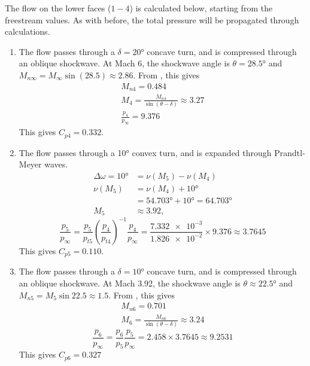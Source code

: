 \documentclass[a4paper]{article}
\begin{document}
The flow on the lower faces (\(1-4\)) is calculated below, starting from the freestream values. As with before, the total pressure will be propagated through calculations.
\begin{enumerate}[label=\arabic*), start=4]
	\item The flow passes through a \(\delta = \ang{20}\) concave turn, and is compressed through an oblique shockwave.
	At Mach 6, the shockwave angle is \(\theta = \ang{28.5}\) and\(M_{n\infty} = M_{\infty}\sin(28.5) \approx 2.86\). From \cite{NASATables}, this gives
	\begin{gather*}
		M_{n4} = 0.484 \\
		M_4 = \frac{M_{n4}}{\sin(\theta - \delta)} \approx 3.27 \\
		\frac{p_4}{p_\infty} = 9.376
	\end{gather*}
	This gives \(C_{p4} = 0.332\).

	\item The flow passes through a \ang{10} convex turn, and is expanded through Prandtl-Meyer waves.
	\begin{align*}
		\Delta \omega = \ang{10} &= \nu(M_5) - \nu(M_4) \\
		\nu(M_5) &= \nu(M_4) + \ang{10} \\
		&= \ang{54.703} + \ang{10} = \ang{64.703} \\
		M_5 &\approx 3.92,\
	\end{align*}
	\begin{equation*}
		\frac{p_5}{p_\infty} = \frac{p_5}{p_{t5}} \left( \frac{p_4}{p_{t4}} \right)^{-1} \frac{p_4}{p_\infty}
		= \frac{\num{7.332e-3}}{\num{1.826e-2}} \times 9.376
		\approx 3.7645
	\end{equation*}
	This gives \(C_{p5} = 0.110\).

	\item The flow passes through a \(\delta = \ang{10}\) concave turn, and is compressed through an oblique shockwave. At Mach 3.92, the shockwave angle is \(\theta \approx \ang{22.5}\) and \(M_{n5} = M_5 \sin{22.5} \approx 1.5\). From \cite{NASATables}, this gives
	\begin{gather*}
		M_{n6} = 0.701 \\
		M_6 = \frac{M_{n6}}{\sin(\theta - \delta)} \approx 3.24
	\end{gather*}
	\begin{equation*}
		\frac{p_6}{p_\infty} = \frac{p_6}{p_5} \frac{p_5}{p_\infty}
		= 2.458 \times 3.7645 \approx 9.2531
	\end{equation*}
	This gives \(C_{p6} = 0.327\)

\end{enumerate}
\end{document}
